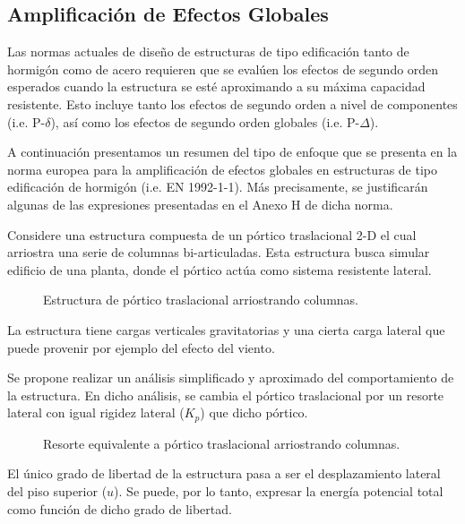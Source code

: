 \subsection{Amplificación de Efectos Globales}

Las normas actuales de diseño de estructuras de tipo edificación tanto de hormigón como de acero requieren que se evalúen los efectos de segundo orden esperados cuando la estructura se esté aproximando a su máxima capacidad resistente. Esto incluye tanto los efectos de segundo orden a nivel de componentes (i.e. P-$\delta$), así como los efectos de segundo orden globales (i.e. P-$\Delta$).

A continuación presentamos un resumen del tipo de enfoque que se presenta en la norma europea para la amplificación de efectos globales en estructuras de tipo edificación de hormigón (i.e. EN 1992-1-1). Más precisamente, se justificarán algunas de las expresiones presentadas en el Anexo H de dicha norma.

Considere una estructura compuesta de un pórtico traslacional 2-D el cual arriostra una serie de columnas bi-articuladas. Esta estructura busca simular edificio de una planta, donde el pórtico actúa como sistema resistente lateral.

\begin{figure}[htb]
  \centering
  \def\svgwidth{0.8\textwidth}
  
	\caption{Estructura de pórtico traslacional arriostrando columnas.}
	\label{fig:globales}
\end{figure}

La estructura tiene cargas verticales gravitatorias y una cierta carga lateral que puede provenir por ejemplo del efecto del viento.

Se propone realizar un análisis simplificado y aproximado del comportamiento de la estructura. En dicho análisis, se cambia el pórtico traslacional por un resorte lateral con igual rigidez lateral ($K_{p}$) que dicho pórtico.

\begin{figure}[htb]
  \centering
  \def\svgwidth{0.6\textwidth}
  
	\caption{Resorte equivalente a pórtico traslacional arriostrando columnas.}
	\label{fig:globales2}
\end{figure}

El único grado de libertad de la estructura pasa a ser el desplazamiento lateral del piso superior ($u$). Se puede, por lo tanto, expresar la energía potencial total como función de dicho grado de libertad.

